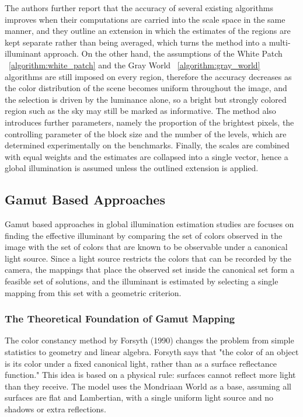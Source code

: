 The authors further report that the accuracy of several existing algorithms improves when their computations are carried into the scale space in the same manner, and they outline an extension in which the estimates of the regions are kept separate rather than being averaged, which turns the method into a multi-illuminant approach. On the other hand, the assumptions of the White Patch ~\ref{algorithm:white_patch} and the Gray World ~\ref{algorithm:gray_world} algorithms are still imposed on every region, therefore the accuracy decreases as the color distribution of the scene becomes uniform throughout the image, and the selection is driven by the luminance alone, so a bright but strongly colored region such as the sky may still be marked as informative. The method also introduces further parameters, namely the proportion of the brightest pixels, the controlling parameter of the block size and the number of the levels, which are determined experimentally on the benchmarks. Finally, the scales are combined with equal weights and the estimates are collapsed into a single vector, hence a global illumination is assumed unless the outlined extension is applied.

\subsection{Gamut Based Approaches}
\label{sec:gamut_based_approaches}

Gamut based approaches in global illumination estimation studies are focuses on finding the effective illuminant by comparing the set of colors observed in the image with the set of colors that are known to be observable under a canonical light source. Since a light source restricts the colors that can be recorded by the camera, the mappings that place the observed set inside the canonical set form a feasible set of solutions, and the illuminant is estimated by selecting a single mapping from this set with a geometric criterion.

\subsubsection{The Theoretical Foundation of Gamut Mapping}
\label{algorithm:theoretical_foundation_of_gamut}

The color constancy method by Forsyth (1990) \cite{baseofgamut} changes the problem from simple statistics to geometry and linear algebra. Forsyth says that "the color of an object is its color under a fixed canonical light, rather than as a surface reflectance function." This idea is based on a physical rule: surfaces cannot reflect more light than they receive. The model uses the Mondriaan World as a base, assuming all surfaces are flat and Lambertian, with a single uniform light source and no shadows or extra reflections.


